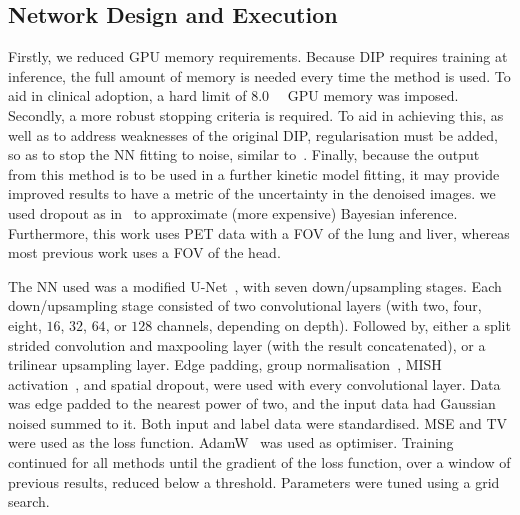     \subsection{Network Design and Execution} \label{sec:network_design_and_execution}
        Firstly, we reduced \acrshort{GPU} memory requirements. Because \gls{DIP} requires training at inference, the full amount of memory is needed every time the method is used. To aid in clinical adoption, a hard limit of \SI{8.0}{\giga\byte} \acrshort{GPU} memory was imposed. Secondly, a more robust stopping criteria is required. %
        To aid in achieving this, as well as to address weaknesses of the original \gls{DIP}, regularisation must be added, so as to stop the \gls{NN} fitting to noise, similar to~\cite{Liu2019ImagePrior}. Finally, because the output from this method is to be used in a further kinetic model fitting, it may provide improved results to have a metric of the uncertainty in the denoised images. we used dropout as in~\cite{Gal2015DropoutLearning} to approximate (more expensive) Bayesian inference. Furthermore, this work uses \acrshort{PET} data with a \gls{FOV} of the lung and liver, whereas most previous work uses a \gls{FOV} of the head.
    
        The \gls{NN} used was a modified U-Net~\cite{Weng2015U-Net:Segmentation}, with seven down/upsampling stages. Each down/upsampling stage consisted of two convolutional layers (with two, four, eight, $16$, $32$, $64$, or $128$ channels, depending on depth). Followed by, either a split strided convolution and maxpooling layer (with the result concatenated), or a trilinear upsampling layer. Edge padding, group normalisation~\cite{Wu2018GroupNormalization}, MISH activation~\cite{Misra2020Mish:Function}, and spatial dropout, were used with every convolutional layer. Data was edge padded to the nearest power of two, and the input data had Gaussian noised summed to it. Both input and label data were standardised. \acrlong{MSE} and \gls{TV} were used as the loss function. AdamW~\cite{Loshchilov2017DecoupledRegularization} was used as optimiser. Training continued for all methods until the gradient of the loss function, over a window of previous results, reduced below a threshold. Parameters were tuned using a grid search.
        
